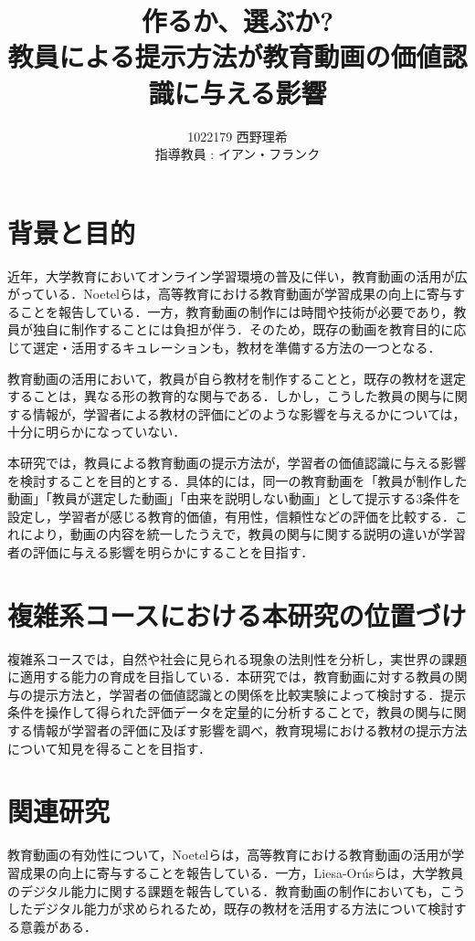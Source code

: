 \documentclass[11pt]{ltjarticle}
\author{%
1022179 西野理希\\指導教員 : イアン・フランク
}
\title{作るか、選ぶか?\\教員による提示方法が教育動画の価値認識に与える影響}
\begin{document}
\maketitle

\section{背景と目的}

近年，大学教育においてオンライン学習環境の普及に伴い，教育動画の活用が広がっている．Noetelら\cite{noetel2021}は，高等教育における教育動画が学習成果の向上に寄与することを報告している．一方，教育動画の制作には時間や技術が必要であり，教員が独自に制作することには負担が伴う．そのため，既存の動画を教育目的に応じて選定・活用するキュレーションも，教材を準備する方法の一つとなる．

教育動画の活用において，教員が自ら教材を制作することと，既存の教材を選定することは，異なる形の教育的な関与である．しかし，こうした教員の関与に関する情報が，学習者による教材の評価にどのような影響を与えるかについては，十分に明らかになっていない．

本研究では，教員による教育動画の提示方法が，学習者の価値認識に与える影響を検討することを目的とする．具体的には，同一の教育動画を「教員が制作した動画」「教員が選定した動画」「由来を説明しない動画」として提示する3条件を設定し，学習者が感じる教育的価値，有用性，信頼性などの評価を比較する．これにより，動画の内容を統一したうえで，教員の関与に関する説明の違いが学習者の評価に与える影響を明らかにすることを目指す．

\section{複雑系コースにおける本研究の位置づけ}
複雑系コースでは，自然や社会に見られる現象の法則性を分析し，実世界の課題に適用する能力の育成を目指している．本研究では，教育動画に対する教員の関与の提示方法と，学習者の価値認識との関係を比較実験によって検討する．提示条件を操作して得られた評価データを定量的に分析することで，教員の関与に関する情報が学習者の評価に及ぼす影響を調べ，教育現場における教材の提示方法について知見を得ることを目指す．


\section{関連研究}

教育動画の有効性について，Noetelら\cite{noetel2021}は，高等教育における教育動画の活用が学習成果の向上に寄与することを報告している．一方，Liesa-Orúsら\cite{liesa2023}は，大学教員のデジタル能力に関する課題を報告している．教育動画の制作においても，こうしたデジタル能力が求められるため，既存の教材を活用する方法について検討する意義がある．
\end{document}
